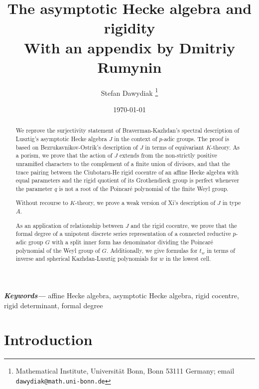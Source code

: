 \documentclass[10pt]{article}
\title{The asymptotic Hecke algebra and rigidity \\ \large With an appendix by Dmitriy Rumynin}
\date{\today}
\author{Stefan Dawydiak \thanks{Mathematical Institute, Universit\"{a}t Bonn, Bonn 53111 Germany; email \texttt{dawydiak@math.uni-bonn.de}}}
\theoremstyle{definition}
\theoremstyle{remark}
\providecommand{\keywords}[1]{\textbf{\textit{Keywords---}} #1}
\begin{document}
\maketitle
\begin{abstract}
We reprove the surjectivity statement of Braverman-Kazhdan's spectral description of Lusztig's asymptotic 
Hecke algebra $J$ in the context of $p$-adic groups. The proof is based on Bezrukavnikov-Ostrik's
description of $J$ in terms of equivariant $K$-theory. As a porism, we prove that 
the action of $J$ extends from the non-strictly positive unramified characters to the complement of a finite 
union of divisors, and that the trace pairing between the Ciubotaru-He rigid cocentre of an 
affine Hecke algebra with equal parameters and the rigid quotient of its Grothendieck group is 
perfect whenever the parameter $q$ is not a root of the Poincar\'{e} polynomial of the finite 
Weyl group.

Without recourse to $K$-theory, we prove a weak version of Xi's description of $J$ in type $A$.

As an application of relationship between $J$ and the rigid cocentre, we prove that
the formal degree of a unipotent discrete series representation of a connected reductive
$p$-adic group $G$ with a split inner form has denominator dividing the Poincar\'{e} polynomial of the Weyl 
group of $G$. Additionally, we give formulas for $t_w$ in terms of inverse and spherical Kazhdan-Lusztig 
polynomials for $w$ in the lowest cell.
\end{abstract}
\keywords{affine Hecke algebra, asymptotic Hecke algebra, rigid cocentre, rigid determinant, formal degree}
%
\tableofcontents


\section{Introduction}
\end{document}
